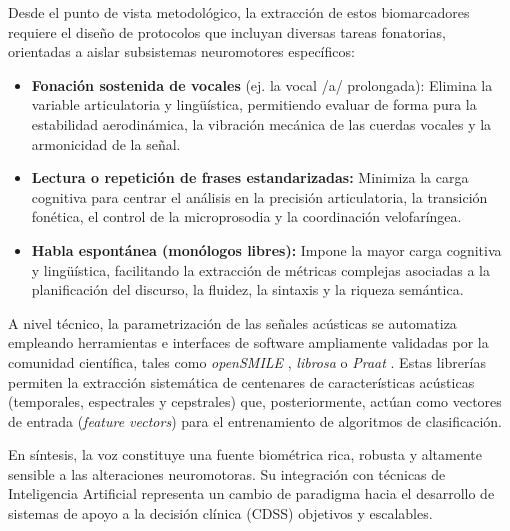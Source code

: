 Desde el punto de vista metodológico, la extracción de estos biomarcadores requiere el diseño de protocolos que incluyan diversas tareas fonatorias, orientadas a aislar subsistemas neuromotores específicos:

\begin{itemize}
    \item \textbf{Fonación sostenida de vocales} (ej. la vocal /a/ prolongada): Elimina la variable articulatoria y lingüística, permitiendo evaluar de forma pura la estabilidad aerodinámica, la vibración mecánica de las cuerdas vocales y la armonicidad de la señal.
    \item \textbf{Lectura o repetición de frases estandarizadas:} Minimiza la carga cognitiva para centrar el análisis en la precisión articulatoria, la transición fonética, el control de la microprosodia y la coordinación velofaríngea.
    \item \textbf{Habla espontánea (monólogos libres):} Impone la mayor carga cognitiva y lingüística, facilitando la extracción de métricas complejas asociadas a la planificación del discurso, la fluidez, la sintaxis y la riqueza semántica.
\end{itemize}

A nivel técnico, la parametrización de las señales acústicas se automatiza empleando herramientas e interfaces de software ampliamente validadas por la comunidad científica, tales como \textit{openSMILE} \cite{eyben2010}, \textit{librosa} \cite{mcfee2015} o \textit{Praat} \cite{boersma2001}. Estas librerías permiten la extracción sistemática de centenares de características acústicas (temporales, espectrales y cepstrales) que, posteriormente, actúan como vectores de entrada (\textit{feature vectors}) para el entrenamiento de algoritmos de clasificación.

En síntesis, la voz constituye una fuente biométrica rica, robusta y altamente sensible a las alteraciones neuromotoras. Su integración con técnicas de Inteligencia Artificial representa un cambio de paradigma hacia el desarrollo de sistemas de apoyo a la decisión clínica (CDSS) objetivos y escalables.